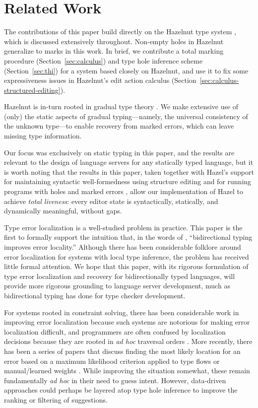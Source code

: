 \section{Related Work}
\label{sec:related}

The contributions of this paper build directly on the Hazelnut type system \cite{omar2017b}, which is discussed extensively throughout. Non-empty holes in Hazelnut generalize to marks in this work. In brief, we contribute a total marking procedure (Section~\ref{sec:calculus}) and type hole inference scheme (Section~\ref{sec:thi}) for a system based closely on Hazelnut, and use it to fix some expressiveness issues in Hazelnut's edit action calculus (Section~\ref{sec:calculus-structured-editing}). 

Hazelnut is in-turn rooted in gradual type theory \cite{siek2006, siek2015}. We make extensive use of (only) the static aspects of gradual typing---namely, the universal consistency of the unknown type---to enable recovery from marked errors, which can leave missing type information.

Our focus was exclusively on static typing in this paper, and the results are relevant to the design of language servers for any statically typed language, but it is worth noting that the results in this paper, taken together with Hazel's support for maintaining syntactic well-formedness using structure editing \cite{moon2023,moon2022} and for running programs with holes and marked errors \cite{omar2019}, allow our implementation of Hazel to achieve \emph{total liveness}: every editor state is syntactically, statically, and dynamically meaningful, without gaps.

Type error localization is a well-studied problem in practice. This paper is the first to formally support the intuition that, in the words of \citet{dunfield2019}, ``bidirectional typing improves error locality.'' Although there has been considerable folklore around error localization 
for systems with local type inference, the problem has received little formal attention. We hope that this paper, with its rigorous formulation
of type error localization and recovery for bidirectionally typed languages, will provide more rigorous grounding to language server development,
much as bidirectional typing has done for type checker development.

For systems rooted in constraint solving, there has been considerable work in improving error localization because such systems are notorious for making error localization difficult, and programmers are often confused by localization decisions \cite{wand1986} because they are rooted in \emph{ad hoc} traversal orders \cite{mcadam1999,lee1998}. 
More recently, there has been a series of papers that discuss finding the most likely location for an error based on a maximum likelihood criterion applied to type flows \cite{zhang2014} or manual/learned weights \cite{pavlinovic2014,seidel2017}.
While improving the situation somewhat, these remain fundamentally \emph{ad hoc} in their need to guess intent. However, data-driven approaches could perhaps be layered atop type hole inference to improve the ranking or filtering of suggestions.

